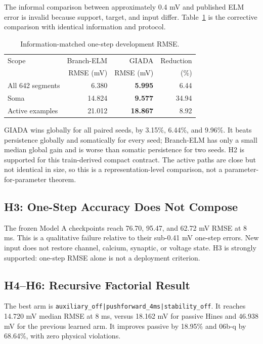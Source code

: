 \documentclass[11pt]{article}
\begin{document}
The informal comparison between approximately 0.4 mV and published ELM error
is invalid because support, target, and input differ. Table~\ref{tab:elm} is
the corrective comparison with identical information and protocol.

\begin{table}[t]
\centering
\caption{Information-matched one-step development RMSE.}
\label{tab:elm}
\small
\begin{tabular}{lrrr}
\toprule
Scope & Branch-ELM & GIADA & Reduction \\
 & RMSE (mV) & RMSE (mV) & (\%) \\
\midrule
All 642 segments & 6.380 & \textbf{5.995} & 6.44 \\
Soma & 14.824 & \textbf{9.577} & 34.94 \\
Active examples & 21.012 & \textbf{18.867} & 8.92 \\
\bottomrule
\end{tabular}
\end{table}

GIADA wins globally for all paired seeds, by 3.15\%, 6.44\%, and 9.96\%.
It beats persistence globally and somatically for every seed; Branch-ELM has
only a small median global gain and is worse than somatic persistence for two
seeds. H2 is supported for this train-derived compact contract. The active
paths are close but not identical in size, so this is a representation-level
comparison, not a parameter-for-parameter theorem.

\subsection{H3: One-Step Accuracy Does Not Compose}

The frozen Model A checkpoints reach 76.70, 95.47, and 62.72 mV RMSE at 8 ms.
This is a qualitative failure relative to their sub-0.41 mV one-step errors.
New input does not restore channel, calcium, synaptic, or voltage state. H3 is
strongly supported: one-step RMSE alone is not a deployment criterion.

\subsection{H4--H6: Recursive Factorial Result}

The best arm is
\texttt{auxiliary\_off|pushforward\_4ms|stability\_off}. It reaches 14.720 mV
median RMSE at 8 ms, versus 18.162 mV for passive Hines and 46.938 mV for the
previous learned arm. It improves passive by 18.95\% and 06b-q by 68.64\%, with
zero physical violations.
\end{document}
